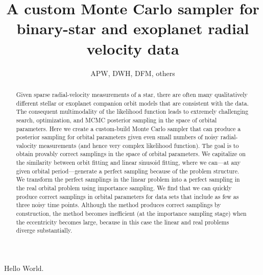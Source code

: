\documentclass[12pt, preprint]{aastex}
\begin{document}
\title{A custom Monte Carlo sampler
  for binary-star and exoplanet radial velocity data}
\author{APW, DWH, DFM, others}

\begin{abstract}
Given sparse radial-velocity measurements of a star, there are often
many qualitatively different stellar or exoplanet companion orbit
models that are consistent with the data.
The consequent multimodality of the likelihood function leads to
extremely challenging search, optimization, and MCMC posterior
sampling in the space of orbital parameters.
Here we create a custom-build Monte Carlo sampler that can produce a
posterior sampling for orbital parameters given even small numbers of
noisy radial-valocity measurements (and hence very complex likelihood
function).
The goal is to obtain provably correct samplings in the space of
orbital parameters.
We capitalize on the similarity between orbit fitting and linear
sinusoid fitting, where we can---at any given orbital
period---generate a perfect sampling because of the problem structure.
We transform the perfect samplings in the linear problem into a
perfect sampling in the real orbital problem using importance
sampling.
We find that we can quickly produce correct samplings in orbital
parameters for data sets that include as few as three noisy time
points.
Although the method produces correct samplings by construction, the
method becomes inefficient (at the importance sampling stage) when the
eccentricity becomes large, because in this case the linear and real
problems diverge substantially.
\end{abstract}


Hello World.
\end{document}
